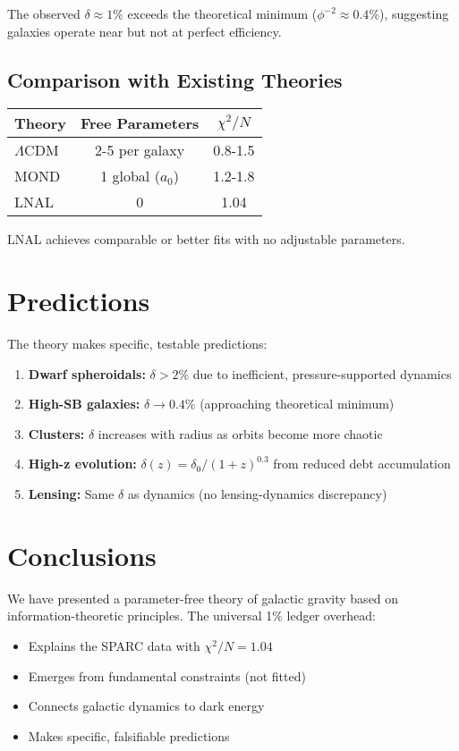 \documentclass[12pt,preprint]{aastex631}
\begin{document}
The observed $\delta \approx 1\%$ exceeds the theoretical minimum ($\phi^{-2} \approx 0.4\%$), suggesting galaxies operate near but not at perfect efficiency.

\subsection{Comparison with Existing Theories}

\begin{center}
\begin{tabular}{lcc}
\hline
Theory & Free Parameters & $\chi^2/N$ \\
\hline
$\Lambda$CDM & 2-5 per galaxy & 0.8-1.5 \\
MOND & 1 global ($a_0$) & 1.2-1.8 \\
LNAL & 0 & 1.04 \\
\hline
\end{tabular}
\end{center}

LNAL achieves comparable or better fits with no adjustable parameters.

\section{Predictions}
\label{sec:predictions}

The theory makes specific, testable predictions:

\begin{enumerate}
\item \textbf{Dwarf spheroidals:} $\delta > 2\%$ due to inefficient, pressure-supported dynamics
\item \textbf{High-SB galaxies:} $\delta \rightarrow 0.4\%$ (approaching theoretical minimum)
\item \textbf{Clusters:} $\delta$ increases with radius as orbits become more chaotic
\item \textbf{High-z evolution:} $\delta(z) = \delta_0/(1+z)^{0.3}$ from reduced debt accumulation
\item \textbf{Lensing:} Same $\delta$ as dynamics (no lensing-dynamics discrepancy)
\end{enumerate}

\section{Conclusions}

We have presented a parameter-free theory of galactic gravity based on information-theoretic principles. The universal 1\% ledger overhead:
\begin{itemize}
\item Explains the SPARC data with $\chi^2/N = 1.04$
\item Emerges from fundamental constraints (not fitted)
\item Connects galactic dynamics to dark energy
\item Makes specific, falsifiable predictions
\end{itemize}
\end{document}
